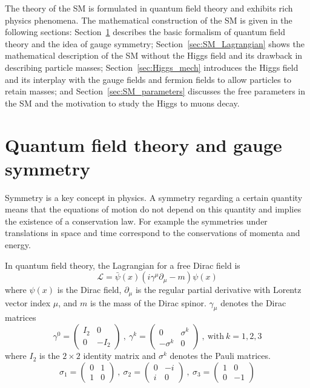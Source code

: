 The theory of the SM is formulated in quantum field theory and exhibits rich physics phenomena.
The mathematical construction of the SM is given in the following sections:
Section~\ref{sec:gauge_symmetry} describes the basic formalism of quantum field theory and the idea of gauge symmetry;
Section~\ref{sec:SM_Lagrangian} shows the mathematical description of the SM without the Higgs field and its drawback in describing particle masses;
Section~\ref{sec:Higgs_mech} introduces the Higgs field and its interplay with the gauge fields and fermion fields to allow particles to retain masses;
and Section~\ref{sec:SM_parameters} discusses the free parameters in the SM and the motivation to study the Higgs to muons decay.


\section{Quantum field theory and gauge symmetry}\label{sec:gauge_symmetry}

Symmetry is a key concept in physics. 
A symmetry regarding a certain quantity means that the equations of motion do not depend on this quantity
and implies the existence of a conservation law.
For example the symmetries under translations in space and time correspond to the conservations of momenta and energy.

In quantum field theory, the Lagrangian for a free Dirac field is 
\begin{equation}\label{eq:Dirac_Lagrangian}
    \mathcal{L} = \bar{\psi}(x)(i\gamma^{\mu}\partial_{\mu}-m)\psi(x)
\end{equation}
where $\psi(x)$ is the Dirac field,
$\partial_{\mu}$ is the regular partial derivative with Lorentz vector index $\mu$,
and $m$ is the mass of the Dirac spinor.
$\gamma_{\mu}$ denotes the Dirac matrices
\begin{equation}\label{eq:dirac_matrices}
    \gamma^{0} = \begin{pmatrix}  I_{2} & 0 \\ 0 & -I_{2}    \end{pmatrix} ~,~
    \gamma^{k} = \begin{pmatrix}  0 & \sigma^{k} \\ -\sigma^{k} & 0 \end{pmatrix} ~,~
    \text{with} ~ k = 1,2,3 
\end{equation}
where $I_{2}$ is the $2 \times 2$ identity matrix and $\sigma^{k}$ denotes the Pauli matrices.
\begin{equation}\label{eq:pauli_matrices}
    \sigma_{1} = \begin{pmatrix} 0 & 1 \\ 1 & 0 \end{pmatrix} ~,~
    \sigma_{2} = \begin{pmatrix} 0 & -i \\ i & 0\end{pmatrix} ~,~
    \sigma_{3} = \begin{pmatrix} 1 & 0 \\ 0 & -1\end{pmatrix}
\end{equation}

